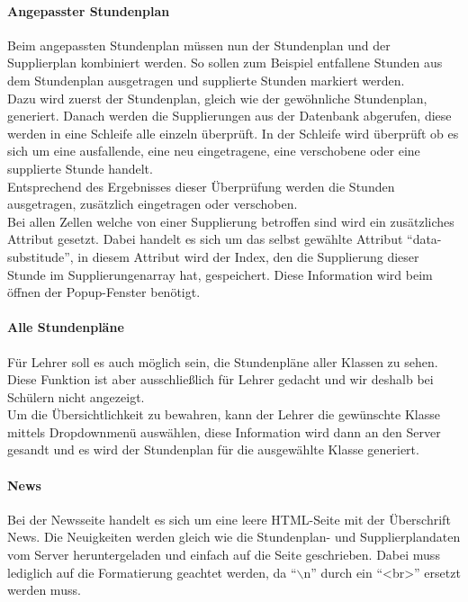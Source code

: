 \paragraph{Angepasster Stundenplan\\}
Beim angepassten Stundenplan müssen nun der Stundenplan und der Supplierplan kombiniert werden. So sollen zum Beispiel entfallene Stunden aus dem Stundenplan ausgetragen und supplierte Stunden markiert werden.\\
Dazu wird zuerst der Stundenplan, gleich wie der gewöhnliche Stundenplan, generiert. Danach werden die Supplierungen aus der Datenbank abgerufen, diese werden in eine Schleife alle einzeln überprüft. In der Schleife wird überprüft ob es sich um eine ausfallende, eine neu eingetragene, eine verschobene oder eine supplierte Stunde handelt.\\ Entsprechend des Ergebnisses dieser Überprüfung werden die Stunden ausgetragen, zusätzlich eingetragen oder verschoben.\\
Bei allen Zellen welche von einer Supplierung betroffen sind wird ein zusätzliches Attribut gesetzt. Dabei handelt es sich um das selbst gewählte Attribut \enquote{data-substitude}, in diesem Attribut wird der Index, den die Supplierung dieser Stunde im Supplierungenarray hat, gespeichert. Diese Information wird beim öffnen der Popup-Fenster benötigt.\\

\paragraph{Alle Stundenpläne}
Für Lehrer soll es auch möglich sein, die Stundenpläne aller Klassen zu sehen. Diese Funktion ist aber ausschließlich für Lehrer gedacht und wir deshalb bei Schülern nicht angezeigt.\\
Um die Übersichtlichkeit zu bewahren, kann der Lehrer die gewünschte Klasse mittels Dropdownmenü auswählen, diese Information wird dann an den Server gesandt und es wird der Stundenplan für die ausgewählte Klasse generiert.\\


\paragraph{News\\}
Bei der Newsseite handelt es sich um eine leere HTML-Seite mit der Überschrift News. Die Neuigkeiten werden gleich wie die Stundenplan- und Supplierplandaten vom Server heruntergeladen und einfach auf die Seite geschrieben. Dabei muss lediglich auf die Formatierung geachtet werden, da \enquote{$\backslash$n} durch ein \enquote{<br>} ersetzt werden muss.\\

